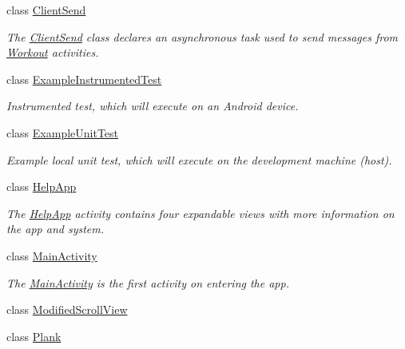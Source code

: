 \begin{DoxyCompactItemize}
class \mbox{\hyperlink{classcom_1_1example_1_1trainawearapplication_1_1_client_send}{Client\+Send}}
\begin{DoxyCompactList}\small\item\em The \mbox{\hyperlink{classcom_1_1example_1_1trainawearapplication_1_1_client_send}{Client\+Send}} class declares an asynchronous task used to send messages from \mbox{\hyperlink{classcom_1_1example_1_1trainawearapplication_1_1_workout}{Workout}} activities. \end{DoxyCompactList}\item 
class \mbox{\hyperlink{classcom_1_1example_1_1trainawearapplication_1_1_example_instrumented_test}{Example\+Instrumented\+Test}}
\begin{DoxyCompactList}\small\item\em Instrumented test, which will execute on an Android device. \end{DoxyCompactList}\item 
class \mbox{\hyperlink{classcom_1_1example_1_1trainawearapplication_1_1_example_unit_test}{Example\+Unit\+Test}}
\begin{DoxyCompactList}\small\item\em Example local unit test, which will execute on the development machine (host). \end{DoxyCompactList}\item 
class \mbox{\hyperlink{classcom_1_1example_1_1trainawearapplication_1_1_help_app}{Help\+App}}
\begin{DoxyCompactList}\small\item\em The \mbox{\hyperlink{classcom_1_1example_1_1trainawearapplication_1_1_help_app}{Help\+App}} activity contains four expandable views with more information on the app and system. \end{DoxyCompactList}\item 
class \mbox{\hyperlink{classcom_1_1example_1_1trainawearapplication_1_1_main_activity}{Main\+Activity}}
\begin{DoxyCompactList}\small\item\em The \mbox{\hyperlink{classcom_1_1example_1_1trainawearapplication_1_1_main_activity}{Main\+Activity}} is the first activity on entering the app. \end{DoxyCompactList}\item 
class \mbox{\hyperlink{classcom_1_1example_1_1trainawearapplication_1_1_modified_scroll_view}{Modified\+Scroll\+View}}
\item 
class \mbox{\hyperlink{classcom_1_1example_1_1trainawearapplication_1_1_plank}{Plank}}

\end{DoxyCompactItemize}
